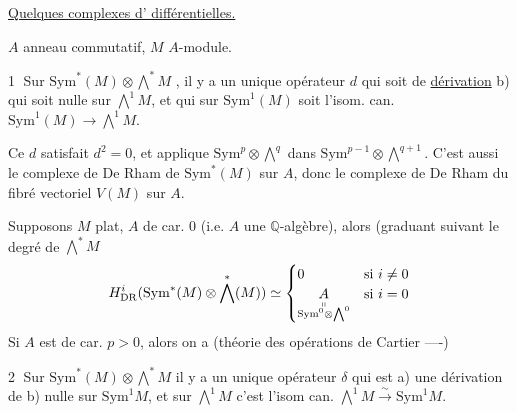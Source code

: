\uline{Quelques complexes d' différentielles.}

$A$ anneau commutatif, $M$ $A$-module. 

\textcircled{1} Sur $\mathrm{Sym}^{\ast}(M)\otimes\bigwedge^{\ast}M$ , il y a un
unique opérateur $d$ qui soit de   \uline{dérivation} 
b) qui soit nulle sur $\bigwedge^{1}M$, et qui
sur $\mathrm{Sym}^{1}(M)$ soit l'isom. can. $\mathrm{Sym}^{1}(M)\longrightarrow\bigwedge^{1}M$.

 Ce $d$  satisfait $d^2=0$, et applique $\mathrm{Sym}^{p}\otimes\bigwedge^{q}$ dans $\mathrm{Sym}^{p-1}\otimes\bigwedge^{q+1}$.  
C'est aussi le complexe de De Rham de $\mathrm{Sym}^{\ast}(M)$ sur $A$, donc le complexe de De Rham du fibré vectoriel $V(M)$ sur $A$.

Supposons $M$ plat,  $A$ de car. 0 (i.e. $A$ une $\mathbb Q$-algèbre), alors
 (graduant suivant le degré de $\bigwedge^\ast M$
\[
H^i_{\mathrm{DR}}(\mathrm{Sym}^{\ast}(M)\otimes\bigwedge^{\ast}(M))\simeq
\begin{cases}0&\text{si }i\ne0\\
\underset{\substack{\shortparallel\\[-2pt]\mathrm{Sym}^{0}\otimes\bigwedge^{0}}}{A}&\text{si }i=0\end{cases}
\]
Si $A$ est de car. $p>0$, alors on a  (théorie des opérations de Cartier ----)

\textcircled{2} Sur $\mathrm{Sym}^{\ast}(M)\otimes\bigwedge^\ast M$  il y a un unique opérateur $\delta$ qui est 
a) une dérivation  de  
b) nulle sur  $\mathrm{Sym}^{1}M$, et sur $\bigwedge^{1}M$ c'est l'isom can. $\bigwedge^{1}M\xrightarrow{\sim}\mathrm{Sym}^{1}M$.

